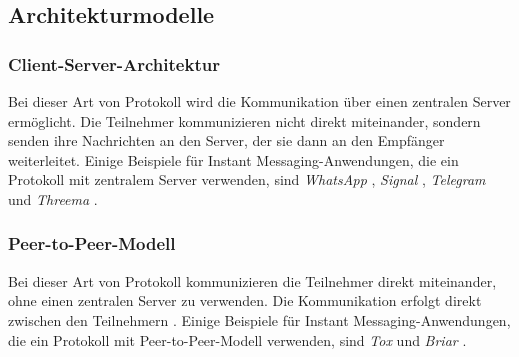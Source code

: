 \subsection{Architekturmodelle}

\subsubsection{Client-Server-Architektur}

Bei dieser Art von Protokoll wird die Kommunikation über einen zentralen Server ermöglicht. Die Teilnehmer kommunizieren nicht direkt miteinander, sondern senden ihre Nachrichten an den Server, der sie dann an den Empfänger weiterleitet\Parencite[S. 3]{Hanson_ServerManagement}. Einige Beispiele für Instant Messaging-Anwendungen, die ein Protokoll mit zentralem Server verwenden, sind \textit{WhatsApp} \parencite{Vanerio_WhatsAppArchitecture}, \textit{Signal} \parencite{Github_libsignal}, \textit{Telegram} \parencite{Telegram_ServerSourceCode} und \textit{Threema} \parencite{Threema_ServerLocation}.

\subsubsection{Peer-to-Peer-Modell}

Bei dieser Art von Protokoll kommunizieren die Teilnehmer direkt miteinander, ohne einen zentralen Server zu verwenden. Die Kommunikation erfolgt direkt zwischen den Teilnehmern \parencites[S. 6-8]{Mahlmann_P2PNetzwerke}{Galuba_P2POverlayNetworks}. Einige Beispiele für Instant Messaging-Anwendungen, die ein Protokoll mit Peer-to-Peer-Modell verwenden, sind \textit{Tox} \parencite{Tox_FAQ} und \textit{Briar} \parencite{Briar_HowItWorks}.